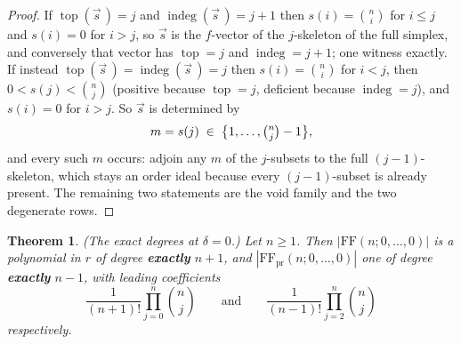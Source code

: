 \documentclass[11pt, a4paper, abstract=yes]{scrartcl}
\theoremstyle{definition}
\theoremstyle{remark}
\theoremstyle{plain}
\newtheorem{theorem}[definition]{Theorem}
\newcommand{\indeg}{\operatorname{indeg}}
\newcommand{\tp}{\operatorname{top}}
\begin{document}
\begin{proof}
If \(\tp(\vec s\,)=j\) and \(\indeg(\vec s\,)=j+1\) then \(s(i)=\binom ni\) for \(i\le j\) and \(s(i)=0\)
for \(i>j\), so \(\vec s\) is the \(f\)-vector of the \(j\)-skeleton of the full simplex, and
conversely that vector has \(\tp=j\) and \(\indeg=j+1\); one witness exactly. If instead
\(\tp(\vec s\,)=\indeg(\vec s\,)=j\) then \(s(i)=\binom ni\) for \(i<j\), then
\(0<s(j)<\binom nj\) (positive because \(\tp=j\), deficient because \(\indeg=j\)), and
\(s(i)=0\) for \(i>j\). So \(\vec s\) is determined by
\begin{equation}\label{eq:A-structure-m}
  m=s(j)\;\in\;\bigl\lbrace1,\dots,\tbinom nj-1\bigr\rbrace ,
\end{equation}
and every such \(m\) occurs: adjoin any \(m\) of the \(j\)-subsets to the full \((j-1)\)-skeleton,
which stays an order ideal because every \((j-1)\)-subset is already present. The remaining two
statements are the void family and the two degenerate rows.
\end{proof}

\begin{theorem}
(\emph{The exact degrees at \(\delta=0\).}) Let \(n\ge1\). Then \(|\mathrm{FF}(n;0,\dots,0)|\) is a
polynomial in \(r\) of degree \textbf{exactly} \(n+1\), and \(|\mathrm{FF}_{\mathrm{pr}}(n;0,\dots,0)|\) one
of degree \textbf{exactly} \(n-1\), with leading coefficients
\begin{equation}\label{eq:delta0-leading}
  \frac{1}{(n+1)!}\prod_{j=0}^{n}\binom nj
  \qquad\text{and}\qquad
  \frac{1}{(n-1)!}\prod_{j=2}^{n}\binom nj
\end{equation}
respectively.
\label{thm-delta0-degrees}
\end{theorem}
\end{document}
